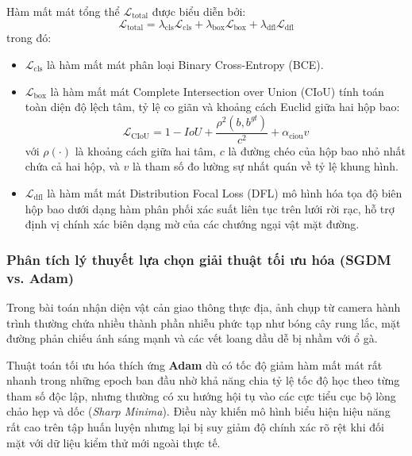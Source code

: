 Hàm mất mát tổng thể $\mathcal{L}_{\text{total}}$ được biểu diễn bởi:
\begin{equation}
\label{eq:total_loss}
\mathcal{L}_{\text{total}} = \lambda_{\text{cls}} \mathcal{L}_{\text{cls}} + \lambda_{\text{box}} \mathcal{L}_{\text{box}} + \lambda_{\text{dfl}} \mathcal{L}_{\text{dfl}}
\end{equation}
trong đó:
\begin{itemize}
    \item $\mathcal{L}_{\text{cls}}$ là hàm mất mát phân loại Binary Cross-Entropy (BCE).
    \item $\mathcal{L}_{\text{box}}$ là hàm mất mát Complete Intersection over Union (CIoU) tính toán toàn diện độ lệch tâm, tỷ lệ co giãn và khoảng cách Euclid giữa hai hộp bao:
    \begin{equation}
    \label{eq:ciou_loss}
    \mathcal{L}_{\text{CIoU}} = 1 - IoU + \frac{\rho^2(b, b^{gt})}{c^2} + \alpha_{\text{ciou}} v
    \end{equation}
    với $\rho(\cdot)$ là khoảng cách giữa hai tâm, $c$ là đường chéo của hộp bao nhỏ nhất chứa cả hai hộp, và $v$ là tham số đo lường sự nhất quán về tỷ lệ khung hình.
    \item $\mathcal{L}_{\text{dfl}}$ là hàm mất mát Distribution Focal Loss (DFL) mô hình hóa tọa độ biên hộp bao dưới dạng hàm phân phối xác suất liên tục trên lưới rời rạc, hỗ trợ định vị chính xác biên dạng mờ của các chướng ngại vật mặt đường.
\end{itemize}

\subsubsection{Phân tích lý thuyết lựa chọn giải thuật tối ưu hóa (SGDM vs. Adam)}
Trong bài toán nhận diện vật cản giao thông thực địa, ảnh chụp từ camera hành trình thường chứa nhiều thành phần nhiễu phức tạp như bóng cây rung lắc, mặt đường phản chiếu ánh sáng mạnh và các vết loang dầu dễ bị nhầm với ổ gà. 

Thuật toán tối ưu hóa thích ứng \textbf{Adam} dù có tốc độ giảm hàm mất mát rất nhanh trong những epoch ban đầu nhờ khả năng chia tỷ lệ tốc độ học theo từng tham số độc lập, nhưng thường có xu hướng hội tụ vào các cực tiểu cục bộ lòng chảo hẹp và dốc (\textit{Sharp Minima}). Điều này khiến mô hình biểu hiện hiệu năng rất cao trên tập huấn luyện nhưng lại bị suy giảm độ chính xác rõ rệt khi đối mặt với dữ liệu kiểm thử mới ngoài thực tế.

